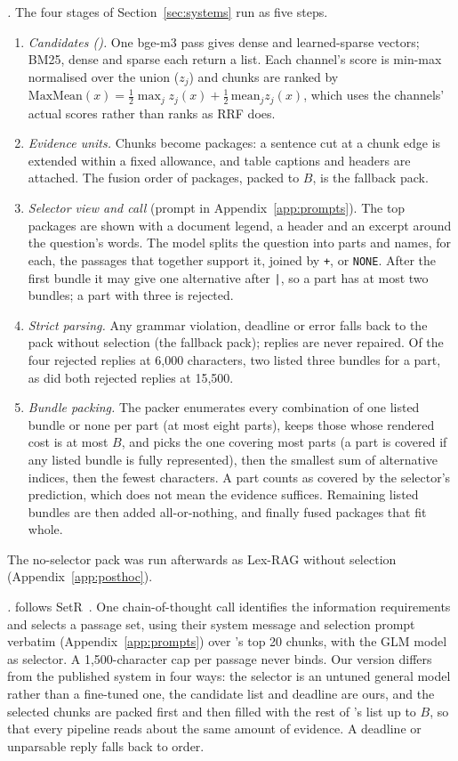 \emph{\lexb.} The four stages of Section~\ref{sec:systems} run as five steps.
\begin{enumerate}
  \item \emph{Candidates (\ftwo).} One bge-m3 pass gives dense and learned-sparse vectors; BM25, dense and sparse each return a list. Each channel's score is min-max normalised over the union ($z_j$) and chunks are ranked by $\mathrm{MaxMean}(x)=\tfrac12\max_j z_j(x)+\tfrac12\,\mathrm{mean}_j z_j(x)$, which uses the channels' actual scores rather than ranks as RRF does.
  \item \emph{Evidence units.} Chunks become packages: a sentence cut at a chunk edge is extended within a fixed allowance, and table captions and headers are attached. The fusion order of packages, packed to $B$, is the fallback pack.
  \item \emph{Selector view and call} (prompt in Appendix~\ref{app:prompts}). The top packages are shown with a document legend, a header and an excerpt around the question's words. The model splits the question into parts and names, for each, the passages that together support it, joined by \texttt{+}, or \texttt{NONE}. After the first bundle it may give one alternative after \texttt{|}, so a part has at most two bundles; a part with three is rejected.
  \item \emph{Strict parsing.} Any grammar violation, deadline or error falls back to the pack without selection (the fallback pack); replies are never repaired. Of the four rejected replies at 6,000 characters, two listed three bundles for a part, as did both rejected replies at 15,500.
  \item \emph{Bundle packing.} The packer enumerates every combination of one listed bundle or none per part (at most eight parts), keeps those whose rendered cost is at most $B$, and picks the one covering most parts (a part is covered if any listed bundle is fully represented), then the smallest sum of alternative indices, then the fewest characters. A part counts as covered by the selector's prediction, which does not mean the evidence suffices. Remaining listed bundles are then added all-or-nothing, and finally fused packages that fit whole.
\end{enumerate}
The no-selector pack was run afterwards as Lex-RAG without selection (Appendix~\ref{app:posthoc}).

\emph{\setr.} \setr{} follows SetR~\citep{lee2025setr}. One chain-of-thought call identifies the information requirements and selects a passage set, using their system message and selection prompt verbatim (Appendix~\ref{app:prompts}) over \hybrid's top 20 chunks, with the GLM model as selector. A 1,500-character cap per passage never binds. Our version differs from the published system in four ways: the selector is an untuned general model rather than a fine-tuned one, the candidate list and deadline are ours, and the selected chunks are packed first and then filled with the rest of \hybrid's list up to $B$, so that every pipeline reads about the same amount of evidence. A deadline or unparsable reply falls back to \hybrid{} order.

